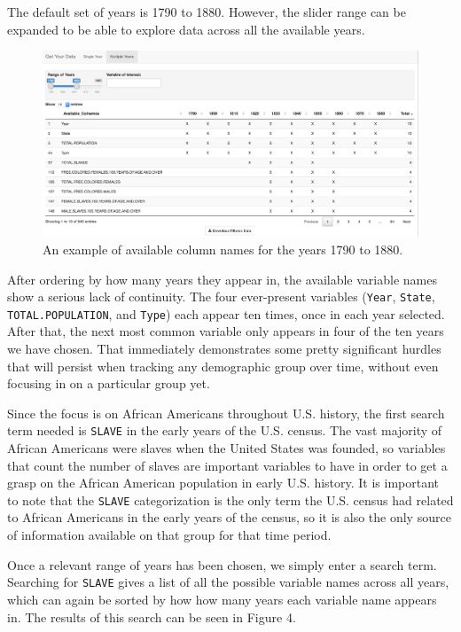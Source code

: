 \documentclass[11pt,]{article}
\begin{document}
The default set of years is 1790 to 1880. However, the slider range can
be expanded to be able to explore data across all the available years.

\begin{figure}[htbp]
\centering
\includegraphics{./figures/app-sshot-multiple-years.png}
\caption{An example of available column names for the years 1790 to
1880.}
\end{figure}

After ordering by how many years they appear in, the available variable
names show a serious lack of continuity. The four ever-present variables
(\texttt{Year}, \texttt{State}, \texttt{TOTAL.POPULATION}, and
\texttt{Type}) each appear ten times, once in each year selected. After
that, the next most common variable only appears in four of the ten
years we have chosen. That immediately demonstrates some pretty
significant hurdles that will persist when tracking any demographic
group over time, without even focusing in on a particular group yet.

Since the focus is on African Americans throughout U.S. history, the
first search term needed is \texttt{SLAVE} in the early years of the
U.S. census. The vast majority of African Americans were slaves when the
United States was founded, so variables that count the number of slaves
are important variables to have in order to get a grasp on the African
American population in early U.S. history. It is important to note that
the \texttt{SLAVE} categorization is the only term the U.S. census had
related to African Americans in the early years of the census, so it is
also the only source of information available on that group for that
time period.

Once a relevant range of years has been chosen, we simply enter a search
term. Searching for \texttt{SLAVE} gives a list of all the possible
variable names across all years, which can again be sorted by how how
many years each variable name appears in. The results of this search can
be seen in Figure 4.
\end{document}
